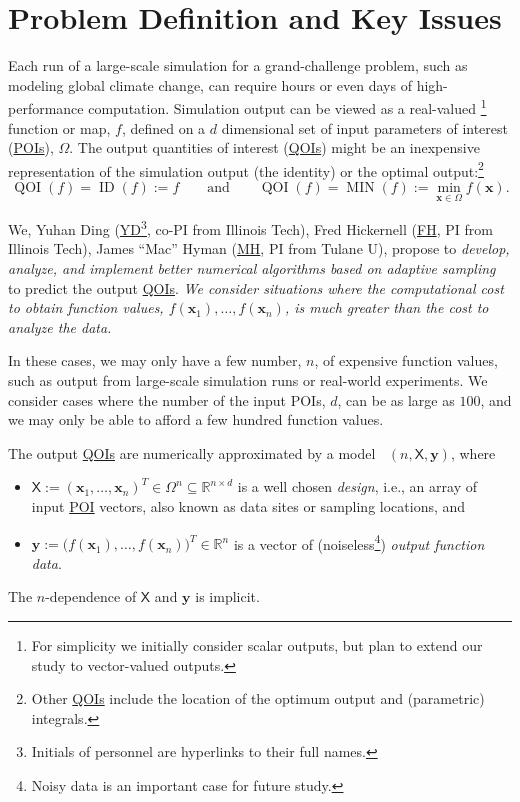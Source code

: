 \documentclass[11pt]{NSFamsart}
\newcommand{\FH}{\hyperlink{FHlink}{FH}\xspace}
\newcommand{\MH}{\hyperlink{MHlink}{MH}\xspace}
\newcommand{\YD}{\hyperlink{YDlink}{YD}\xspace}
\newcommand{\QOIs}{\hyperlink{QOIlink}{QOIs}\xspace}
\newcommand{\POIs}{\hyperlink{POIlink}{POIs}\xspace}
\DeclareMathOperator{\QOI}{QOI} %
\DeclareMathOperator{\APP}{\widehat{\QOI}}
\DeclareMathOperator{\MIN}{MIN}
\DeclareMathOperator{\ID}{ID}
\newcommand{\reals}{{\mathbb{R}}}
\newcommand{\mX}{\mathsf{X}}
\newcommand{\bx}{{\boldsymbol{x}}}
\newcommand{\by}{{\boldsymbol{y}}}
\begin{document}
\section{Problem Definition and Key Issues} \label{sec:defineProb}
Each run of a large-scale simulation for a grand-challenge problem, such as modeling global climate change, can require hours or even days of high-performance computation. Simulation output can be viewed as a real-valued%
\footnote{For simplicity we initially consider scalar outputs, but plan to extend our study to vector-valued outputs.}  
function or map, $f$, defined on a $d$ dimensional set of input \hypertarget{POIlink}{parameters of interest} (\POIs), $\Omega$. 
The output \hypertarget{QOIlink}{quantities of interest} (\QOIs) might be an inexpensive representation of the simulation output (the identity) or the optimal output:\footnote{Other \QOIs include the location of the optimum output and (parametric) integrals.} 
\begin{equation} \label{eq:ourQOIs}
\QOI(f) = \ID(f) := f \qquad \text{and} \qquad \QOI(f) = \MIN(f) := \min_{\bx \in \Omega} f(\bx).
\end{equation}

We, \hypertarget{YDlink}{Yuhan Ding} (\YD\footnote{Initials of personnel are hyperlinks to their full names.}, co-PI from Illinois Tech), \hypertarget{FHlink}{Fred Hickernell} (\FH, PI from Illinois Tech), \hypertarget{MHlink}{James ``Mac'' Hyman} (\MH, PI from Tulane U),  propose to \emph{develop, analyze, and implement better numerical algorithms based on adaptive sampling} to predict the output \QOIs.
\emph{We consider situations where the  computational cost to obtain function values, $f(\bx_1), \ldots, f(\bx_n)$, is much greater than the cost to analyze the data.}  

In these cases, we may only have a few number, $n$, of expensive function values, such as output from large-scale simulation runs or real-world experiments. 
We consider cases where the number of the input POIs, $d$, can be as large as $100$, and we may only be able to afford a few hundred function values. 

The output \QOIs are numerically approximated by a model $\APP(n,\mX,\by)$, where 
\begin{itemize}
\item $\mX := (\bx_1, \ldots, \bx_n)^T \in \Omega^{n} \subseteq \reals^{n \times d}$ is a well chosen \emph{design}, i.e., an array of input \hyperlink{POIlink}{POI\xspace} vectors, also known as data sites or sampling locations, and
\item $\by := \bigl(f(\bx_1), \ldots, f(\bx_n) \bigr)^T \in \reals^n$ is a vector of (noiseless\footnote{Noisy data is an important case for future study.}) \emph{output function data}.
\end{itemize} 
The $n$-dependence of $\mX$ and $\by$ is implicit. 
\end{document}
